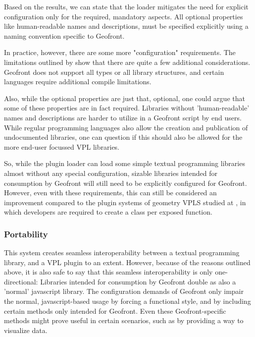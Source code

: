 Based on the results, we can state that the loader mitigates the need for explicit configuration only for the required, mandatory aspects. 
All optional properties like human-readable names and descriptions, must be specified explicitly using a naming convention specific to Geofront. 

In practice, however, there are some more "configuration" requirements. 
The limitations outlined by  show that there are quite a few additional considerations. 
Geofront does not support all types or all library structures, and certain languages require additional compile limitations.

Also, while the optional properties are just that, optional, one could argue that some of these properties are in fact required. 
Libraries without 'human-readable' names and descriptions are harder to utilize in a Geofront script by end users.
While regular programming languages also allow the creation and publication of undocumented libraries, one can question if this should also be allowed for the more end-user focussed VPL libraries.

So, while the plugin loader can load some simple textual programming libraries almost without any special configuration, sizable libraries intended for consumption by Geofront will still need to be explicitly configured for Geofront.
However, even with these requirements, this can still be considered an improvement compared to the plugin systems of geometry VPLS studied at , 
in which developers are required to create a class per exposed function.

\subsubsection{Portability}

This system creates seamless interoperability between a textual programming library, and a VPL plugin to an extent. 
However, because of the reasons outlined above, it is also safe to say that this seamless interoperability is only one-directional: 
Libraries intended for consumption by Geofront double as also a 'normal' javascript library. 
The configuration demands of Geofront only impair the normal, javascript-based usage by forcing a functional style, and by including certain methods only intended for Geofront. 
Even these Geofront-specific methods might prove useful in certain scenarios, such as by providing a way to visualize data.

